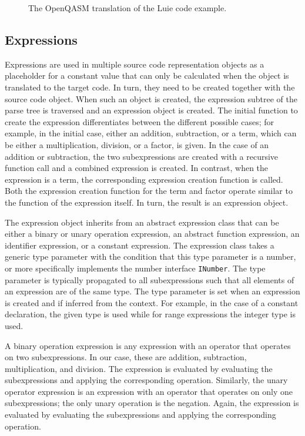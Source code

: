 \begin{figure}
    \centering
    
    \caption{The OpenQASM translation of the Luie code example.}
    \label{fig:codeGen_target_example}
\end{figure}


\subsection{Expressions}
\label{sec:implementation_expression}
Expressions are used in multiple source code representation objects as a placeholder for a constant value that can only be calculated when the object is translated to the target code. In turn, they need to be created together with the source code object. When such an object is created, the expression subtree of the parse tree is traversed and an expression object is created. The initial function to create the expression differentiates between the different possible cases; for example, in the initial case, either an addition, subtraction, or a term, which can be either a multiplication, division, or a factor, is given. In the case of an addition or subtraction, the two subexpressions are created with a recursive function call and a combined expression is created. In contrast, when the expression is a term, the corresponding expression creation function is called. Both the expression creation function for the term and factor operate similar to the function of the expression itself. In turn, the result is an expression object. 

The expression object inherits from an abstract expression class that can be either a binary or unary operation expression, an abstract function expression, an identifier expression, or a constant expression. The expression class takes a generic type parameter with the condition that this type parameter is a number, or more specifically implements the number interface \texttt{INumber}. The type parameter is typically propagated to all subexpressions such that all elements of an expression are of the same type. The type parameter is set when an expression is created and if inferred from the context. For example, in the case of a constant declaration, the given type is used while for range expressions the integer type is used.    

A binary operation expression is any expression with an operator that operates on two subexpressions. In our case, these are addition, subtraction, multiplication, and division. The expression is evaluated by evaluating the subexpressions and applying the corresponding operation. Similarly, the unary operator expression is an expression with an operator that operates on only one subexpressions; the only unary operation is the negation. Again, the expression is evaluated by evaluating the subexpressions and applying the corresponding operation. 

